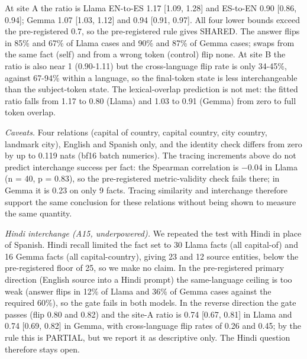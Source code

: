 \documentclass[11pt]{article}
\begin{document}
At site A the ratio is Llama EN-to-ES 1.17 {[}1.09, 1.28{]} and ES-to-EN 0.90 {[}0.86, 0.94{]}; Gemma 1.07 {[}1.03, 1.12{]} and 0.94 {[}0.91, 0.97{]}. All four lower bounds exceed the pre-registered 0.7, so the pre-registered rule gives SHARED. The answer flips in 85\% and 67\% of Llama cases and 90\% and 87\% of Gemma cases; swaps from the same fact (self) and from a wrong token (control) flip none. At site B the ratio is also near 1 (0.90-1.11) but the cross-language flip rate is only 34-45\%, against 67-94\% within a language, so the final-token state is less interchangeable than the subject-token state. The lexical-overlap prediction is not met: the fitted ratio falls from 1.17 to 0.80 (Llama) and 1.03 to 0.91 (Gemma) from zero to full token overlap.

\emph{Caveats.} Four relations (capital of country, capital country, city country, landmark city), English and Spanish only, and the identity check differs from zero by up to 0.119 nats (bf16 batch numerics). The tracing increments above do not predict interchange success per fact: the Spearman correlation is −0.04 in Llama (n = 40, p = 0.83), so the pre-registered metric-validity check fails there; in Gemma it is 0.23 on only 9 facts. Tracing similarity and interchange therefore support the same conclusion for these relations without being shown to measure the same quantity.

\emph{Hindi interchange (A15, underpowered).} We repeated the test with Hindi in place of Spanish. Hindi recall limited the fact set to 30 Llama facts (all capital-of) and 16 Gemma facts (all capital-country), giving 23 and 12 source entities, below the pre-registered floor of 25, so we make no claim. In the pre-registered primary direction (English source into a Hindi prompt) the same-language ceiling is too weak (answer flips in 12\% of Llama and 36\% of Gemma cases against the required 60\%), so the gate fails in both models. In the reverse direction the gate passes (flip 0.80 and 0.82) and the site-A ratio is 0.74 {[}0.67, 0.81{]} in Llama and 0.74 {[}0.69, 0.82{]} in Gemma, with cross-language flip rates of 0.26 and 0.45; by the rule this is PARTIAL, but we report it as descriptive only. The Hindi question therefore stays open.
\end{document}
